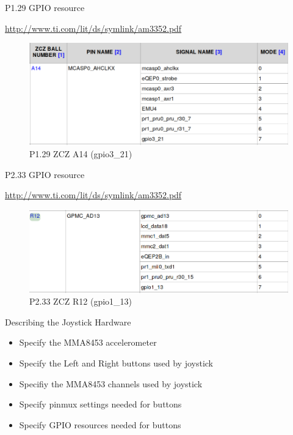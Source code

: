 \begin{frame}
	{P1.29 GPIO resource}

	\url{http://www.ti.com/lit/ds/symlink/am3352.pdf}

	     \begin{figure}[H]
		\includegraphics[width=5in]{IMAGES/p129-zcz-a14}
		     \caption{P1.29 ZCZ A14 (gpio3\_21)}
	     \end{figure}
\end{frame}

\begin{frame}
	{P2.33 GPIO resource}

	\url{http://www.ti.com/lit/ds/symlink/am3352.pdf}

	     \begin{figure}[H]
		\includegraphics[width=5in]{IMAGES/p233-zcz-r12}
		     \caption{P2.33 ZCZ R12 (gpio1\_13)}
	     \end{figure}
\end{frame}

\begin{frame}
    {Describing the Joystick Hardware}
\begin{itemize}
	\item
		Specify the MMA8453 accelerometer
	\item
		Specify the Left and Right buttons used by joystick
	\item
		Specifiy the MMA8453 channels used by joystick
	\item
		Specify pinmux settings needed for buttons
	\item
		Specify GPIO resources needed for buttons
\end{itemize}
\end{frame}


